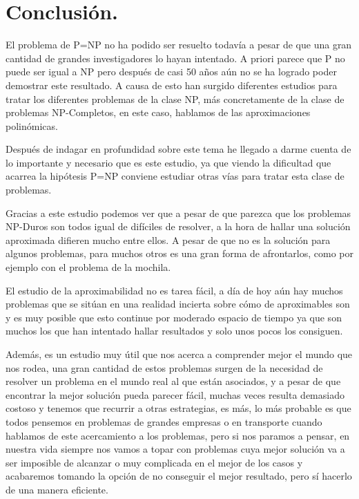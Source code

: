\documentclass[a4paper,12pt,titlepage]{article}
\begin{document}
\newpage

\section{Conclusi\'on.}

El problema de P=NP no ha podido ser resuelto todavía a pesar de que una gran cantidad de grandes investigadores lo hayan intentado. A priori parece que P no puede ser igual a NP pero despu\'es de casi 50 años a\'un no se ha logrado poder demostrar este resultado. A causa de esto han surgido diferentes estudios para tratar los diferentes problemas de la clase NP, m\'as concretamente de la clase de problemas NP-Completos, en este caso, hablamos de las aproximaciones polin\'omicas.

Despu\'es de indagar en profundidad sobre este tema he llegado a darme cuenta de lo importante y necesario que es este estudio, ya que viendo la dificultad que acarrea la hip\'otesis P=NP conviene estudiar otras v\'ias para tratar esta clase de problemas.

Gracias a este estudio podemos ver que a pesar de que parezca que los problemas NP-Duros son todos igual de dif\'iciles de resolver, a la hora de hallar una soluci\'on aproximada difieren mucho entre ellos. A pesar de que no es la soluci\'on para algunos problemas, para muchos otros es una gran forma de afrontarlos, como por ejemplo con el problema de la mochila.

El estudio de la aproximabilidad no es tarea f\'acil, a d\'ia de hoy a\'un hay muchos problemas que se sit\'uan en una realidad incierta sobre c\'omo de aproximables son y es muy posible que esto continue por moderado espacio de tiempo ya que son muchos los que han intentado hallar resultados y solo unos pocos los consiguen.

Adem\'as, es un estudio muy \'util que nos acerca a comprender mejor el mundo que nos rodea, una gran cantidad de estos problemas surgen de la necesidad de resolver un problema en el mundo real al que est\'an asociados, y a pesar de que encontrar la mejor soluci\'on pueda parecer f\'acil, muchas veces resulta demasiado costoso y tenemos que recurrir a otras estrategias, es m\'as, lo m\'as probable es que todos pensemos en problemas de grandes empresas o en transporte cuando hablamos de este acercamiento a los problemas, pero si nos paramos a pensar, en nuestra vida siempre nos vamos a topar con problemas cuya mejor soluci\'on va a ser imposible de alcanzar o muy complicada en el mejor de los casos y acabaremos tomando la opci\'on de no conseguir el mejor resultado, pero s\'i hacerlo de una manera eficiente.

\newpage



\end{document}

